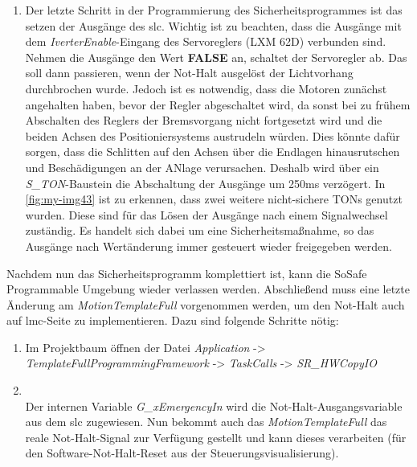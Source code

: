 \documentclass[../../../Bachelorarbeit.tex]{subfiles}
\begin{document}
\begin{enumerate}
    \item Der letzte Schritt in der Programmierung des Sicherheitsprogrammes ist das setzen der Ausgänge des \acs{slc}. Wichtig ist zu beachten, dass die Ausgänge mit dem \textit{IverterEnable}-Eingang des Servoreglers (LXM 62D) verbunden sind. Nehmen die Ausgänge den Wert \textbf{FALSE} an, schaltet der Servoregler ab. Das soll dann passieren, wenn der Not-Halt ausgelöst \bzw der Lichtvorhang durchbrochen wurde. Jedoch ist es notwendig, dass die Motoren zunächst angehalten haben, bevor der Regler abgeschaltet wird, da sonst bei zu frühem Abschalten des Reglers der Bremsvorgang nicht fortgesetzt wird und die beiden Achsen des Positioniersystems austrudeln würden. Dies könnte dafür sorgen, dass die Schlitten auf den Achsen über die Endlagen hinausrutschen und Beschädigungen an der ANlage verursachen. Deshalb wird über ein \textit{S\_TON}-Baustein die Abschaltung der Ausgänge um 250\si{ms} verzögert. In \autoref{fig:my-img43} ist zu erkennen, dass zwei weitere nicht-sichere TONs genutzt wurden. Diese sind für das Lösen der Ausgänge nach einem Signalwechsel zuständig. Es handelt sich dabei um eine Sicherheitsmaßnahme, so das Ausgänge nach Wertänderung immer gesteuert wieder freigegeben werden.
\end{enumerate}

Nachdem nun das Sicherheitsprogramm komplettiert ist, kann die SoSafe Programmable Umgebung wieder verlassen werden. Abschließend muss eine letzte Änderung am \textit{MotionTemplateFull} vorgenommen werden, um den Not-Halt auch auf \acs{lmc}-Seite zu implementieren. Dazu sind folgende Schritte nötig:

\begin{enumerate}
    \item Im Projektbaum öffnen der Datei \textit{Application} -> \textit{TemplateFullProgrammingFramework} -> \textit{TaskCalls} -> \textit{SR\_HWCopyIO}
    \item \begin{minipage}[t]{\linewidth}
        \raggedright
        \label{fig:my-img44}
    \end{minipage}
    \bigskip \\
    Der internen Variable \textit{G\_xEmergencyIn} wird die Not-Halt-Ausgangsvariable aus dem \acs{slc} zugewiesen. Nun bekommt auch das \textit{MotionTemplateFull} das reale Not-Halt-Signal zur Verfügung gestellt und kann dieses verarbeiten (\zB für den Software-Not-Halt-Reset aus der Steuerungsvisualisierung).
\end{enumerate}
\end{document}
